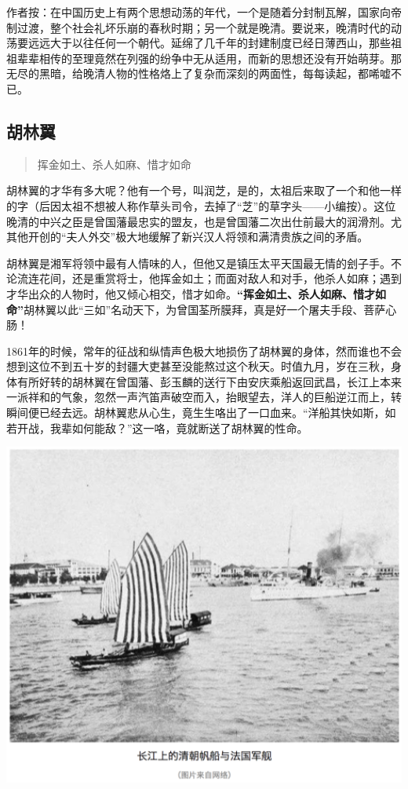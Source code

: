 \documentclass[]{book}
\begin{document}
作者按：在中国历史上有两个思想动荡的年代，一个是随着分封制瓦解，国家向帝制过渡，整个社会礼坏乐崩的春秋时期；另一个就是晚清。要说来，晚清时代的动荡要远远大于以往任何一个朝代。延绵了几千年的封建制度已经日薄西山，那些祖祖辈辈相传的至理竟然在列强的纷争中无从适用，而新的思想还没有开始萌芽。那无尽的黑暗，给晚清人物的性格烙上了复杂而深刻的两面性，每每读起，都唏嘘不已。

\subsection{胡林翼}

\begin{quote}
挥金如土、杀人如麻、惜才如命
\end{quote}

胡林翼的才华有多大呢？他有一个号，叫润芝，是的，太祖后来取了一个和他一样的字（后因太祖不想被人称作草头司令，去掉了``芝''的草字头------小编按）。这位晚清的中兴之臣是曾国藩最忠实的盟友，也是曾国藩二次出仕前最大的润滑剂。尤其他开创的``夫人外交''极大地缓解了新兴汉人将领和满清贵族之间的矛盾。

胡林翼是湘军将领中最有人情味的人，但他又是镇压太平天国最无情的刽子手。不论流连花间，还是重赏将士，他挥金如土；而面对敌人和对手，他杀人如麻；遇到才华出众的人物时，他又倾心相交，惜才如命。\textbf{``挥金如土、杀人如麻、惜才如命''}胡林翼以此``三如''名动天下，为曾国荃所膜拜，真是好一个屠夫手段、菩萨心肠！

1861年的时候，常年的征战和纵情声色极大地损伤了胡林翼的身体，然而谁也不会想到这位不到五十岁的封疆大吏甚至没能熬过这个秋天。时值九月，岁在三秋，身体有所好转的胡林翼在曾国藩、彭玉麟的送行下由安庆乘船返回武昌，长江上本来一派祥和的气象，忽然一声汽笛声破空而入，抬眼望去，洋人的巨船逆江而上，转瞬间便已经去远。胡林翼悲从心生，竟生生咯出了一口血来。``洋船其快如斯，如若开战，我辈如何能敌？''这一咯，竟就断送了胡林翼的性命。

\includegraphics[width=6.67in]{images/his1}
\end{document}
